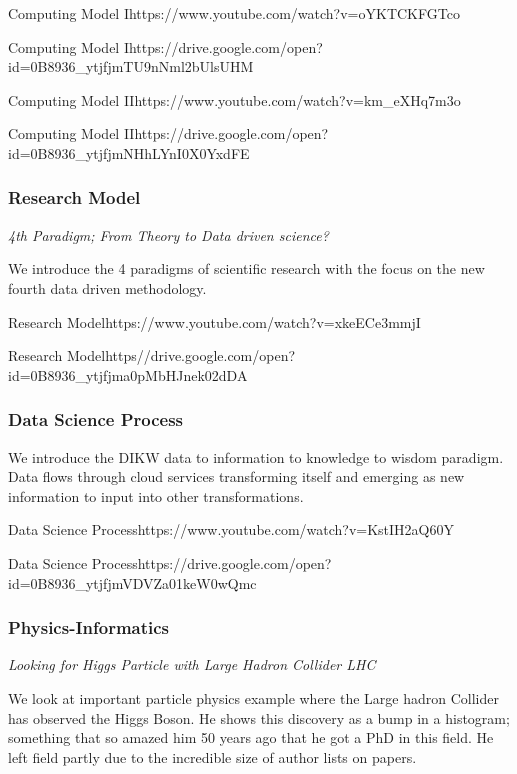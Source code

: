   {Computing Model I}{https://www.youtube.com/watch?v=oYKTCKFGTco}


  {Computing
  Model I}{https://drive.google.com/open?id=0B8936_ytjfjmTU9nNml2bUlsUHM}



  {Computing Model II}{https://www.youtube.com/watch?v=km_eXHq7m3o}


  {Computing
  Model II}{https://drive.google.com/open?id=0B8936_ytjfjmNHhLYnI0X0YxdFE}

\subsubsection{Research Model}\label{research-model}

\emph{4th Paradigm; From Theory to Data driven science?}

We introduce the 4 paradigms of scientific research with the focus on
the new fourth data driven methodology.


  {Research Model}{https://www.youtube.com/watch?v=xkeECe3mmjI}


  {Research  Model}{https//drive.google.com/open?id=0B8936_ytjfjma0pMbHJnek02dDA}


\subsubsection{Data Science Process}\label{data-science-process}

We introduce the DIKW data to information to knowledge to wisdom
paradigm. Data flows through cloud services transforming itself and
emerging as new information to input into other transformations.


 {Data Science Process}{https://www.youtube.com/watch?v=KstIH2aQ60Y}


  {Data  Science Process}{https://drive.google.com/open?id=0B8936_ytjfjmVDVZa01keW0wQmc}


\subsubsection{Physics-Informatics}\label{physics-informatics}

\emph{Looking for Higgs Particle with Large Hadron Collider LHC}

We look at important particle physics example where the Large hadron
Collider has observed the Higgs Boson. He shows this discovery as a bump
in a histogram; something that so amazed him 50 years ago that he got a
PhD in this field. He left field partly due to the incredible size of
author lists on papers.


